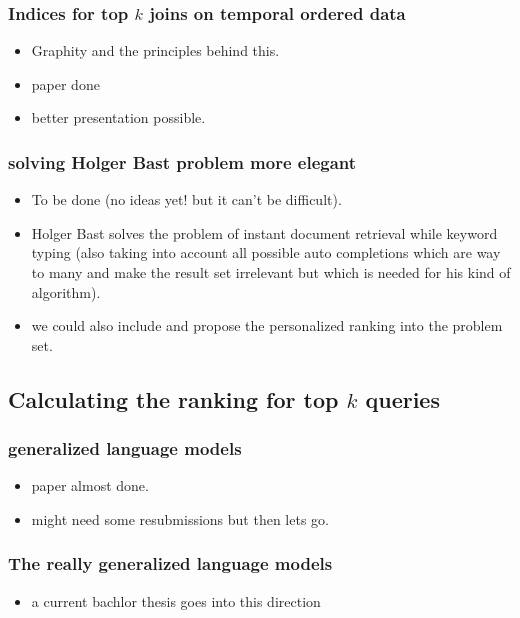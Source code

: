 \documentclass[•]{article}
\begin{document}
\subsubsection{Indices for top $k$ joins on temporal ordered data}
\begin{itemize}
\item Graphity and the principles behind this. 
\item paper done 
\item better presentation possible. 
\end{itemize}

\subsubsection{solving Holger Bast problem more elegant}
\begin{itemize}
\item To be done (no ideas yet! but it can't be difficult).
\item Holger Bast solves the problem of instant document retrieval while keyword typing \cite{RW:Bast:2006} (also taking into account all possible auto completions which are way to many and make the result set irrelevant but which is needed for his kind of algorithm). 
\item we could also include and propose the personalized ranking into the problem set.
\end{itemize}

\subsection{Calculating the ranking for top $k$ queries}

\subsubsection{generalized language models}
\begin{itemize}
\item paper almost done. 
\item might need some resubmissions but then lets go.
\end{itemize}

\subsubsection{The really generalized language models}
\begin{itemize}
\item a current bachlor thesis goes into this direction
\end {itemize}
\end{document}
